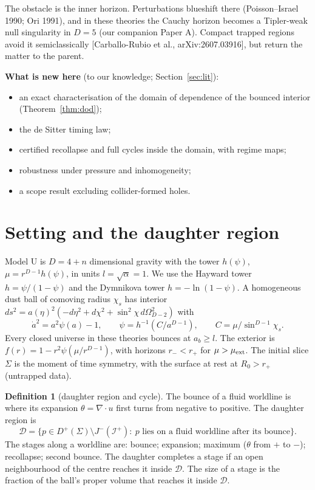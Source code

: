 \documentclass[11pt,a4paper]{article}
\theoremstyle{definition}\newtheorem{definition}[theorem]{Definition}
\theoremstyle{remark}\newtheorem{remark}[theorem]{Remark}
\begin{document}
The obstacle is the inner horizon. Perturbations blueshift there (Poisson--Israel 1990; Ori 1991), and in these theories the Cauchy
horizon becomes a Tipler-weak null singularity in $D=5$ (our companion Paper A). Compact trapped regions avoid it semiclassically
[Carballo-Rubio et al., arXiv:2607.03916], but return the matter to the parent.

\textbf{What is new here} (to our knowledge; Section~\ref{sec:lit}):
\begin{itemize}
\item an exact characterisation of the domain of dependence of the bounced interior (Theorem~\ref{thm:dod});
\item the de Sitter timing law;
\item certified recollapse and full cycles inside the domain, with regime maps;
\item robustness under pressure and inhomogeneity;
\item a scope result excluding collider-formed holes.
\end{itemize}

\section{Setting and the daughter region}
Model U is $D=4+n$ dimensional gravity with the tower $h(\psi)$, $\mu=r^{D-1}h(\psi)$, in units $l=\sqrt\alpha=1$. We use the Hayward
tower $h=\psi/(1-\psi)$ and the Dymnikova tower $h=-\ln(1-\psi)$. A homogeneous dust ball of comoving radius $\chi_s$ has interior
$ds^2=a(\eta)^2(-d\eta^2+d\chi^2+\sin^2\!\chi\,d\Omega^2_{D-2})$ with
\[
\dot a^2=a^2\psi(a)-1,\qquad \psi=h^{-1}(C/a^{D-1}),\qquad C=\mu/\sin^{D-1}\chi_s .
\]
Every closed universe in these theories bounces at $a_b\ge l$. The exterior is $f(r)=1-r^2\psi(\mu/r^{D-1})$, with horizons $r_-<r_+$
for $\mu>\mu_{\rm ext}$. The initial slice $\Sigma$ is the moment of time symmetry, with the surface at rest at $R_0>r_+$ (untrapped
data).

\begin{definition}[daughter region and cycle]\label{def:daughter}
The bounce of a fluid worldline is where its expansion $\theta=\nabla\!\cdot u$ first turns from negative to positive. The daughter
region is
\[
\mathcal D=\{p\in D^+(\Sigma)\setminus J^-(\mathcal I^+):\ p \text{ lies on a fluid worldline after its bounce}\}.
\]
The stages along a worldline are: bounce; expansion; maximum ($\theta$ from $+$ to $-$); recollapse; second bounce. The daughter
completes a stage if an open neighbourhood of the centre reaches it inside $\mathcal D$. The size of a stage is the fraction of the
ball's proper volume that reaches it inside $\mathcal D$.
\end{definition}
\end{document}
